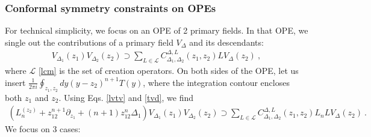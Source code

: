 \documentclass[12pt, a4paper]{article}
\begin{document}
\subsubsection{Conformal symmetry constraints on OPEs}\label{sec:csope}

For technical simplicity, we focus on an OPE of 2 primary fields. In that OPE, we single out the contributions of a primary field $V_\Delta$ and its descendants:
\begin{align}
 V_{\Delta_1}(z_1)V_{\Delta_2}(z_2) \supset \sum_{L\in \mathcal{L}} C_{\Delta_1,\Delta_2}^{\Delta, L}(z_1,z_2) LV_\Delta(z_2) \ ,
\end{align}
where $\mathcal{L}$ \eqref{lcm} is the set of creation operators. On both sides of the OPE, let us insert $\frac{1}{2\pi i}\oint_{z_1,z_2} dy (y-z_2)^{n+1}T(y)$, where the integration contour encloses both $z_1$ and $z_2$. Using Eqs. \eqref{lvtv} and \eqref{tvd}, we find
\begin{align}
 \left(L_n^{(z_2)} +z_{12}^{n+1}\partial_{z_1} + (n+1)z_{12}^n\Delta_1\right) V_{\Delta_1}(z_1)V_{\Delta_2}(z_2) \supset \sum_{L\in \mathcal{L}} C_{\Delta_1,\Delta_2}^{\Delta, L}(z_1,z_2)L_nLV_\Delta(z_2) \ .
\end{align}
We focus on 3 cases:
\end{document}
